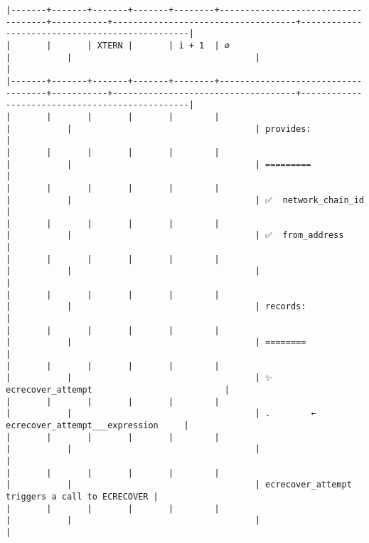 \documentclass[varwidth=\maxdimen,margin=0.5cm,multi={verbatim}]{standalone}
\begin{document}
\begin{verbatim}
|-------+-------+-------+-------+--------+------------------------------------+-----------+------------------------------------+------------------------------------------------|
|       |       | XTERN |       | i + 1  | ∅                                  |           |                                    |                                                |
|-------+-------+-------+-------+--------+------------------------------------+-----------+------------------------------------+------------------------------------------------|
|       |       |       |       |        |                                    |           |                                    | provides:                                      |
|       |       |       |       |        |                                    |           |                                    | =========                                      |
|       |       |       |       |        |                                    |           |                                    | ✅  network_chain_id                           |
|       |       |       |       |        |                                    |           |                                    | ✅  from_address                               |
|       |       |       |       |        |                                    |           |                                    |                                                |
|       |       |       |       |        |                                    |           |                                    | records:                                       |
|       |       |       |       |        |                                    |           |                                    | ========                                       |
|       |       |       |       |        |                                    |           |                                    | ✨  ecrecover_attempt                          |
|       |       |       |       |        |                                    |           |                                    | .        ←  ecrecover_attempt___expression     |
|       |       |       |       |        |                                    |           |                                    |                                                |
|       |       |       |       |        |                                    |           |                                    | ecrecover_attempt triggers a call to ECRECOVER |
|       |       |       |       |        |                                    |           |                                    |                                                |

\end{verbatim}
\end{document}

